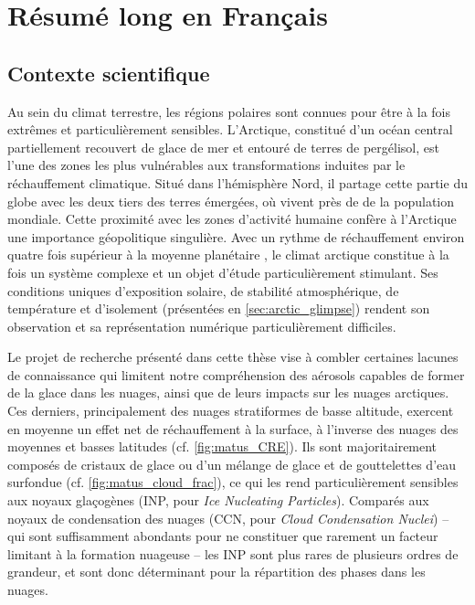 

\chapter{Résumé long en Français}
\label{chap:resume_francais}


\section*{Contexte scientifique}
Au sein du climat terrestre, les régions polaires sont connues pour être à la fois extrêmes et particulièrement sensibles.  
L’Arctique, constitué d’un océan central partiellement recouvert de glace de mer et entouré de terres de pergélisol, est l’une des zones les plus vulnérables aux transformations induites par le réchauffement climatique.  
Situé dans l’hémisphère Nord, il partage cette partie du globe avec les deux tiers des terres émergées, où vivent près de  de la population mondiale.  
Cette proximité avec les zones d’activité humaine confère à l’Arctique une importance géopolitique singulière.  
Avec un rythme de réchauffement environ quatre fois supérieur à la moyenne planétaire \citep{rantanen_arctic_2022}, le climat arctique constitue à la fois un système complexe et un objet d’étude particulièrement stimulant.  
Ses conditions uniques d’exposition solaire, de stabilité atmosphérique, de température et d’isolement (présentées en \cref{sec:arctic_glimpse}) rendent son observation et sa représentation numérique particulièrement difficiles.

Le projet de recherche présenté dans cette thèse vise à combler certaines lacunes de connaissance qui limitent notre compréhension des aérosols capables de former de la glace dans les nuages, ainsi que de leurs impacts sur les nuages arctiques.  
Ces derniers, principalement des nuages stratiformes de basse altitude, exercent en moyenne un effet net de réchauffement à la surface, à l’inverse des nuages des moyennes et basses latitudes (cf. \cref{fig:matus_CRE}).  
Ils sont majoritairement composés de cristaux de glace ou d’un mélange de glace et de gouttelettes d’eau surfondue (cf. \cref{fig:matus_cloud_frac}), ce qui les rend particulièrement sensibles aux noyaux glaçogènes (INP, pour \textit{Ice Nucleating Particles}).  
Comparés aux noyaux de condensation des nuages (CCN, pour \textit{Cloud Condensation Nuclei}) \--- qui sont suffisamment abondants pour ne constituer que rarement un facteur limitant à la formation nuageuse \citep{storelvmo_aerosol_2017} \--- les INP sont plus rares de plusieurs ordres de grandeur, et sont donc déterminant pour la répartition des phases dans les nuages.

